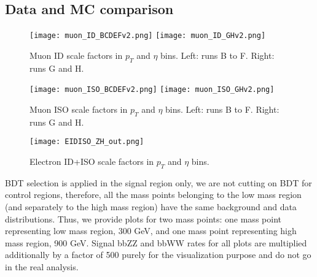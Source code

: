 \subsection{Data and MC comparison\label{sec:compareDataMC}}




\begin{figure}
\centering
\texttt{[image: muon\_ID\_BCDEFv2.png]}
\bigbreak
\texttt{[image: muon\_ID\_GHv2.png]}
\caption{ Muon ID scale factors in $p_{T}$ and $\eta$ bins. Left: runs B to F. Right: runs G and H.}
\label{fig:muonID_SF}
\end{figure}


\begin{figure}
\centering
\texttt{[image: muon\_ISO\_BCDEFv2.png]}
\bigbreak
\texttt{[image: muon\_ISO\_GHv2.png]}
\caption{ Muon ISO scale factors in $p_{T}$ and $\eta$ bins. Left: runs B to F. Right: runs G and H.}
\label{fig:muonISO_SF}
\end{figure}

\begin{figure}
\centering
\texttt{[image: EIDISO\_ZH\_out.png]}
\caption{ Electron ID+ISO scale factors in $p_{T}$ and $\eta$ bins.}
\label{fig:eleIDnISO_SF}
\end{figure}






BDT selection is applied in the signal region only, we are not cutting on BDT for control regions, therefore, all the mass
points belonging to the low mass region (and separately to the high mass region) have the same background and data distributions. Thus, we provide plots for two mass points: one mass point representing low mass region, 300 GeV, and one mass point representing high mass region, 900 GeV. 
Signal bbZZ and bbWW rates for all plots are multiplied additionally by a factor of 500 purely for the visualization purpose and do not go in the real analysis. 


